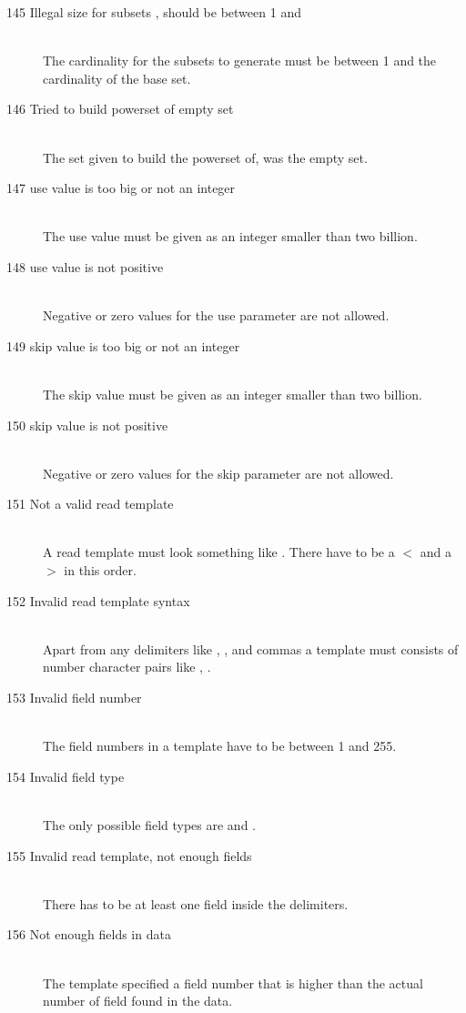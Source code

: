 \begin{description}
\item[145 Illegal size for subsets , should be between 1 
  and ]\ \\
  The cardinality for the subsets to generate must be between 1 
  and the cardinality of the base set.
\item[146 Tried to build powerset of empty set ]\ \\
  The set given to build the powerset of, was the empty set.
%
%
\item[147 use value  is too big or not an integer]\ \\
  The use value must be given as an integer smaller than two billion.
\item[148 use value  is not positive]\ \\
  Negative or zero values for the use parameter are not allowed.
\item[149 skip value  is too big or not an integer]\ \\
  The skip value must be given as an integer smaller than two billion.
\item[150 skip value  is not positive]\ \\
  Negative or zero values for the skip parameter are not allowed.
\item[151 Not a valid read template]\ \\
  A read template must look something like .
  There have to be a $<$ and a $>$ in this order.
\item[152 Invalid read template syntax]\ \\
  Apart from any delimiters like \code{$<$}, \code{$>$}, and commas a
  template must consists of number character pairs like , .
\item[153 Invalid field number ]\ \\
  The field numbers in a template have to be between 1 and 255.
\item[154 Invalid field type ]\ \\
  The only possible field types are  and .
\item[155 Invalid read template, not enough fields]\ \\
  There has to be at least one field inside the delimiters.
\item[156 Not enough fields in data]\ \\
  The template specified a field number that is higher than the actual
  number of field found in the data. 

\end{description}

